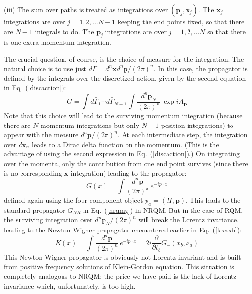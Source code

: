 \documentclass[12pt]{article}
\def\eq#1{{Eq.~(\ref{#1})}}
\begin{document}
(iii) The sum over paths is treated as integrations over $(\bm{p}_j,\bm{x}_j)$. The $\bm{x}_j$ integrations are over $j=1,2,...N-1$ keeping the end points fixed, so that there are $N-1$ integrals to do. The $\bm{p}_j$ integrations are over $j=1,2,...N$ so that there is one extra momentum integration. 

The crucial question, of course, is the choice of measure for the integration. The natural choice is to use just $d\bar\Gamma=d^n \bm{x}d^n \bm{p}/(2\pi)^n$. In this case, the propagator is defined by the integrals over the discretized action, given by the second equation in \eq{discaction}:
\begin{equation}
 G=\int d \bar\Gamma_1 \cdots d \bar\Gamma_{N-1} \, \int \frac{d^n\bm{p}_N}{(2\pi)^n} \ \exp i A_{\bm p}
\end{equation} 
Note that  this choice will lead to the surviving momentum integration (because there are $N$ momentum integrations but only $N-1$ position integrations) to appear with the measure $d^n \bm{p}/(2\pi)^n$. 
At each intermediate step, the  integration over $d\bm{x}_n$ leads to a Dirac delta function on the momentum. (This is the advantage of using the second expression in \eq{discaction}.) On integrating over the momenta, only the contribution from one end point  survives (since there is no corresponding $\bm{x}$ integration) leading to the  propagator:
\begin{equation}
 G(x)=\int \frac{d^n\bm{p}}{(2\pi)^n}\, e^{-ip\cdot x} 
\end{equation} 
defined again using the four-component object $p_a=(H,\bm{p})$. This leads to the standard propagator $G_{NR}$ in \eq{nrqmg} in NRQM. 
But in the case of RQM, the surviving integration over $d^n \bm{p}_N/(2\pi)^n$ will break the Lorentz invariance. 
leading to the Newton-Wigner propagator encountered earlier in \eq{kxaxb}:
\begin{equation}
 K(x)=\int \frac{d^n\bm{p}}{(2\pi)^n}\, e^{-ip\cdot x} =  2i \frac{\partial}{\partial t_b} G_+ (x_b, x_a)
\end{equation} 
This  Newton-Wigner propagator is obviously not Lorentz invariant and is  built from positive frequency solutions of Klein-Gordon equation. This situation
is completely analogous to NRQM; the price we have paid is the lack of Lorentz invariance which, unfortunately, is  too high. 
\end{document}
